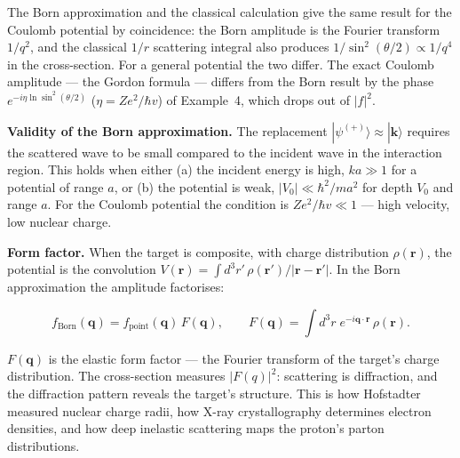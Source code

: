 \begin{note}
The Born approximation and the classical calculation give the same result for the Coulomb potential by coincidence: the Born amplitude is the Fourier transform $1/q^{2}$, and the classical $1/r$ scattering integral also produces $1/\sin^{2}(\theta/2)\propto 1/q^{4}$ in the cross-section. For a general potential the two differ. The exact Coulomb amplitude --- the Gordon formula --- differs from the Born result by the phase $e^{-i\eta\ln\sin^{2}(\theta/2)}$ ($\eta=Ze^{2}/\hbar v$) of Example~4, which drops out of $|f|^{2}$.
\end{note}

\medskip\noindent\textbf{Validity of the Born approximation.}
The replacement $|\psi^{(+)}\rangle\approx|\bm k\rangle$ requires the scattered wave to be small compared to the incident wave in the interaction region. This holds when either (a) the incident energy is high, $ka\gg1$ for a potential of range $a$, or (b) the potential is weak, $|V_{0}|\ll\hbar^{2}/ma^{2}$ for depth $V_{0}$ and range $a$. For the Coulomb potential the condition is $Ze^{2}/\hbar v\ll1$ --- high velocity, low nuclear charge.

\medskip\noindent\textbf{Form factor.}
When the target is composite, with charge distribution $\rho(\bm r)$, the potential is the convolution $V(\bm r)=\int d^{3}r'\,\rho(\bm r')/|\bm r-\bm r'|$. In the Born approximation the amplitude factorises:
\begin{linenomath}
\begin{equation}
f_{\text{Born}}(\bm q)=f_{\text{point}}(\bm q)\,F(\bm q),\qquad F(\bm q)=\int d^{3}r\;e^{-i\bm q\cdot\bm r}\,\rho(\bm r).
\label{eq:form-factor}
\end{equation}
\end{linenomath}
$F(\bm q)$ is the elastic form factor --- the Fourier transform of the target's charge distribution. The cross-section measures $|F(q)|^{2}$: scattering is diffraction, and the diffraction pattern reveals the target's structure. This is how Hofstadter measured nuclear charge radii, how X-ray crystallography determines electron densities, and how deep inelastic scattering maps the proton's parton distributions.

